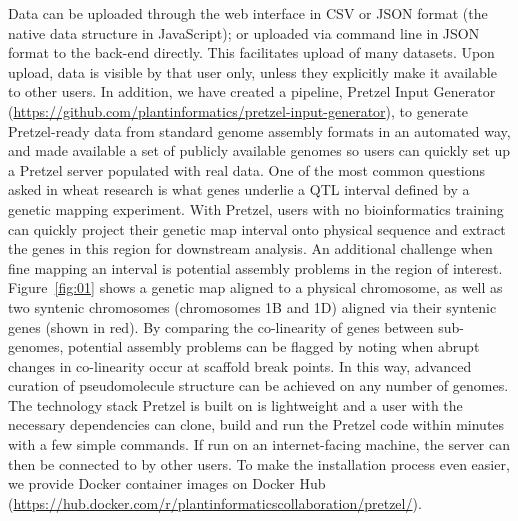 \documentclass{bioinfo}
\begin{document}
\begin{methods}
Data can be uploaded through the web interface in CSV or JSON format (the native data structure in JavaScript); or uploaded via command line in JSON format to the back-end directly. 
This facilitates upload of many datasets. 
Upon upload, data is visible by that user only, unless they explicitly make it available to other users. 
In addition, we have created a pipeline, Pretzel Input Generator (\href{https://github.com/plantinformatics/pretzel-input-generator}{https://github.com/plantinformatics/pretzel-input-generator}), to generate Pretzel-ready data from standard genome assembly formats in an automated way, and made available a set of publicly available genomes so users can quickly set up a Pretzel server populated with real data.
One of the most common questions asked in wheat research is what genes underlie a QTL interval defined by a genetic mapping experiment. 
With Pretzel, users with no bioinformatics training can quickly project their genetic map interval onto physical sequence and extract the genes in this region for downstream analysis. 
An additional challenge when fine mapping an interval is potential assembly problems in the region of interest. Figure~\ref{fig:01} shows a genetic map aligned to a physical chromosome, as well as two syntenic chromosomes (chromosomes 1B and 1D) aligned via their syntenic genes (shown in red). 
By comparing the co-linearity of genes between sub-genomes, potential assembly problems can be flagged by noting when abrupt changes in co-linearity occur at scaffold break points. 
In this way, advanced curation of pseudomolecule structure can be achieved on any number of genomes.
The technology stack Pretzel is built on is lightweight and a user with the necessary dependencies can clone, build and run the Pretzel code within minutes with a few simple commands. 
If run on an internet-facing machine, the server can then be connected to by other users. 
To make the installation process even easier, we provide Docker container images on Docker Hub (\href{https://hub.docker.com/r/plantinformaticscollaboration/pretzel/}{https://hub.docker.com/r/plantinformaticscollaboration/pretzel/}).



\end{methods}
\end{document}

